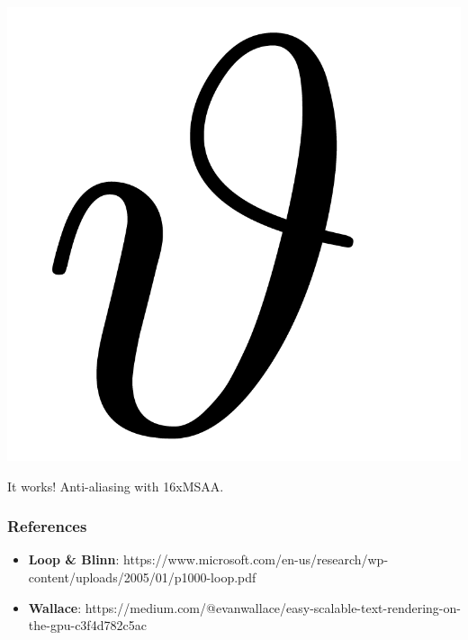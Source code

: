 \documentclass[14pt]{beamer}
\begin{document}
\begin{frame}
    \centering 
    \includegraphics[height=0.625\textheight]{demo/final.png}

    It works! Anti-aliasing with 16xMSAA.

    \scriptsize{\quad}%
\end{frame}

\begin{frame}
    \frametitle{References}


    \begin{itemize}
        \item \textbf{Loop \& Blinn}: https://www.microsoft.com/en-us/research/wp-content/uploads/2005/01/p1000-loop.pdf

        \item \textbf{Wallace}: https://medium.com/@evanwallace/easy-scalable-text-rendering-on-the-gpu-c3f4d782c5ac
    \end{itemize}
\end{frame}
\end{document}
